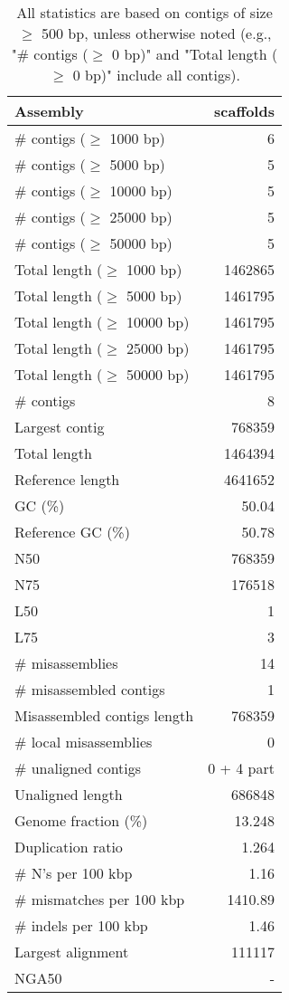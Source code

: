 \documentclass[12pt,a4paper]{article}
\begin{document}
\begin{table}[ht]
\begin{center}
\caption{All statistics are based on contigs of size $\geq$ 500 bp, unless otherwise noted (e.g., "\# contigs ($\geq$ 0 bp)" and "Total length ($\geq$ 0 bp)" include all contigs).}
\begin{tabular}{|l*{1}{|r}|}
\hline
Assembly & scaffolds \\ \hline
\# contigs ($\geq$ 1000 bp) & 6 \\ \hline
\# contigs ($\geq$ 5000 bp) & 5 \\ \hline
\# contigs ($\geq$ 10000 bp) & 5 \\ \hline
\# contigs ($\geq$ 25000 bp) & 5 \\ \hline
\# contigs ($\geq$ 50000 bp) & 5 \\ \hline
Total length ($\geq$ 1000 bp) & 1462865 \\ \hline
Total length ($\geq$ 5000 bp) & 1461795 \\ \hline
Total length ($\geq$ 10000 bp) & 1461795 \\ \hline
Total length ($\geq$ 25000 bp) & 1461795 \\ \hline
Total length ($\geq$ 50000 bp) & 1461795 \\ \hline
\# contigs & 8 \\ \hline
Largest contig & 768359 \\ \hline
Total length & 1464394 \\ \hline
Reference length & 4641652 \\ \hline
GC (\%) & 50.04 \\ \hline
Reference GC (\%) & 50.78 \\ \hline
N50 & 768359 \\ \hline
N75 & 176518 \\ \hline
L50 & 1 \\ \hline
L75 & 3 \\ \hline
\# misassemblies & 14 \\ \hline
\# misassembled contigs & 1 \\ \hline
Misassembled contigs length & 768359 \\ \hline
\# local misassemblies & 0 \\ \hline
\# unaligned contigs & 0 + 4 part \\ \hline
Unaligned length & 686848 \\ \hline
Genome fraction (\%) & 13.248 \\ \hline
Duplication ratio & 1.264 \\ \hline
\# N's per 100 kbp & 1.16 \\ \hline
\# mismatches per 100 kbp & 1410.89 \\ \hline
\# indels per 100 kbp & 1.46 \\ \hline
Largest alignment & 111117 \\ \hline
NGA50 & - \\ \hline
\end{tabular}
\end{center}
\end{table}
\end{document}
